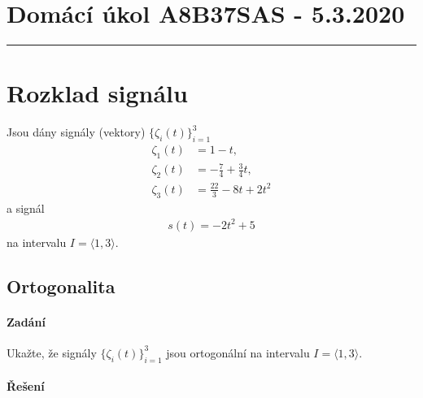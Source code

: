\documentclass[11pt, a4paper]{article}
\begin{document}
	
	
	\section*{Domácí úkol A8B37SAS - 5.3.2020}
	\noindent\rule{12cm}{0.2pt}

	\section{Rozklad signálu}
		
		Jsou dány signály (vektory) $\{ \zeta_i(t) \}_{i=1}^3$
		\begin{align*}
			\zeta_1(t) &= 1 - t,
		\\
			\zeta_2(t) &= - \frac 74 + \frac 34 t,
		\\
			\zeta_3(t) &= \frac{22}{3} - 8t + 2t^2
		\end{align*}
		a signál
		\begin{align*}
			s(t) = -2t^2 + 5
		\end{align*}
		na intervalu $I = \langle 1,3 \rangle$.
		
		\subsection{Ortogonalita}
			
			\paragraph{Zadání}
			
				Ukažte, že signály $\{ \zeta_i(t) \}_{i=1}^3$ jsou ortogonální na intervalu $I = \langle 1,3 \rangle$.
			
			\paragraph{Řešení}
			
\end{document}
